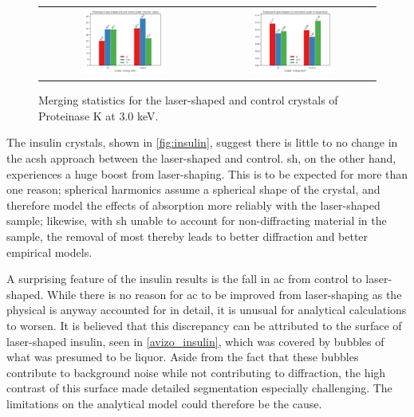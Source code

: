 \begin{figure}[h]
    \centering
    \begin{tabular}{cc}
    \includegraphics[width = 0.5\textwidth]{plots/exp2/prot_I_over_sigma.png} & \includegraphics[width = 0.5\textwidth]{plots/exp2/prot_rmerges.png}
    \end{tabular}
    \caption{Merging statistics for the laser-shaped and control crystals of Proteinase K at 3.0 \unit{keV}.}
    \label{fig:proteinasek}
\end{figure}

The insulin crystals, shown in \cref{fig:insulin}, suggest there is little to no change in the \ac{acsh} approach between the laser-shaped and control. \Ac{sh}, on the other hand, experiences a huge boost from laser-shaping. This is to be expected for more than one reason; spherical harmonics assume a spherical shape of the crystal, and therefore model the effects of absorption more reliably with the laser-shaped sample; likewise, with \ac{sh} unable to account for non-diffracting material in the sample, the removal of most thereby leads to better diffraction and better empirical models.

A surprising feature of the insulin results is the fall in \ac{ac} from control to laser-shaped. While there is no reason for \ac{ac} to be improved from laser-shaping as the physical is anyway accounted for in detail, it is unusual for analytical calculations to worsen. It is believed that this discrepancy can be attributed to the surface of laser-shaped insulin, seen in \cref{avizo_insulin}, which was covered by bubbles of what was presumed to be liquor. Aside from the fact that these bubbles contribute to background noise while not contributing to diffraction, the high contrast of this surface made detailed segmentation especially challenging. The limitations on the analytical model could therefore be the cause. %

